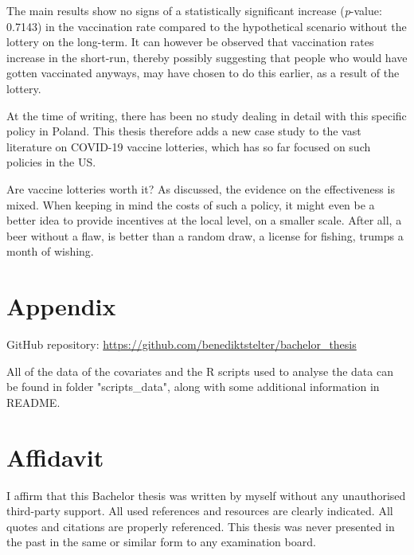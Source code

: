 \documentclass{scrbook}
\begin{document}
The main results show no signs of a statistically significant increase
(\textit{p}-value: 0.7143) in the vaccination rate compared to the
hypothetical scenario without the lottery on the long-term. It can
however be observed that vaccination rates increase in the short-run,
thereby possibly suggesting that people who would have gotten vaccinated
anyways, may have chosen to do this earlier, as a result of the lottery.

At the time of writing, there has been no study dealing in detail with
this specific policy in Poland. This thesis therefore adds a new case
study to the vast literature on COVID-19 vaccine lotteries, which has so
far focused on such policies in the US.

Are vaccine lotteries worth it? As discussed, the evidence on the
effectiveness is mixed. When keeping in mind the costs of such a policy,
it might even be a better idea to provide incentives at the local level,
on a smaller scale. After all, a beer without a flaw, is better than a
random draw, a license for fishing, trumps a month of wishing.


 
\backmatter


 
\renewcommand\refname{References}
\printbibliography[title=References]

\chapter{Appendix}
GitHub repository: \url{https://github.com/benediktstelter/bachelor_thesis}

\noindent All of the data of the covariates and the R scripts used to analyse the data can be found in folder "scripts\_data", along with some additional information in README.



\chapter{Affidavit}
\thispagestyle{empty}

I affirm that this Bachelor thesis was written by myself without any unauthorised third-party support. All used references and resources are clearly indicated. All quotes and citations are properly referenced. This thesis was never presented in the past in the same or similar form to any examination board. 
\end{document}

